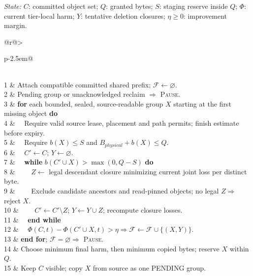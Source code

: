 \begin{algorithm*}[tp]
\caption{\textsc{PrefixAdmission}: shared-prefix groups with staged replacement (revision 3)}
\label{alg:slack-landlord}
\textit{State:} $C$: committed object set; $Q$: granted bytes; $S$: staging reserve inside $Q$;
$\Phi$: current tier-local harm; $Y$: tentative deletion closures; $\eta\ge0$: improvement margin.
\par\medskip
\noindent\begin{minipage}[t]{.48\textwidth}\vspace{0pt}
\begin{tabular}[t]{@{}r@{\hspace{0.5em}}>{\raggedright\arraybackslash}p{\dimexpr\linewidth-2.5em\relax}@{}}
\\
1 & Attach compatible committed shared prefix; $\mathcal F\gets\varnothing$.\\
2 & Pending group or unacknowledged reclaim $\Rightarrow$ \textsc{Pause}.\\
3 & \textbf{for} each bounded, sealed, source-readable group $X$ starting at the first missing object \textbf{do}\\
4 & $\quad$Require valid source lease, placement and path permits; finish estimate before expiry.\\
5 & $\quad$Require $b(X)\le S$ and $B_{physical}+b(X)\le Q$.\\
6 & $\quad C'\gets C$; $Y\gets\varnothing$.\\
7 & $\quad$\textbf{while} $b(C'\cup X)>\max(0,Q-S)$ \textbf{do}\\
8 & $\qquad Z\gets$ legal descendant closure minimizing current joint loss per distinct byte.\\
9 & $\qquad$Exclude candidate ancestors and read-pinned objects; no legal $Z\Rightarrow$ reject $X$.\\
10 & $\qquad C'\gets C'\setminus Z$; $Y\gets Y\cup Z$; recompute closure losses.\\
11 & $\quad$\textbf{end while}\\
12 & $\quad\Phi(C,t)-\Phi(C'\cup X,t)>\eta\Rightarrow\mathcal F\gets\mathcal F\cup\{(X,Y)\}$.\\
13 & \textbf{end for}; $\mathcal F=\varnothing\Rightarrow$ \textsc{Pause}.\\
14 & Choose minimum final harm, then minimum copied bytes; reserve $X$ within $Q$.\\
15 & Keep $C$ visible; copy $X$ from source as one PENDING group.\\

\end{tabular}
\end{minipage}
\end{algorithm*}

